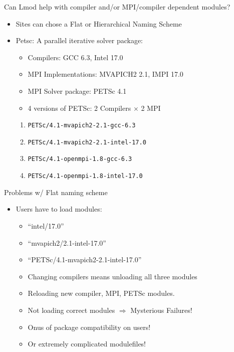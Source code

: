 \documentclass{beamer}
\begin{document}
\begin{frame}{Can Lmod help with compiler and/or MPI/compiler
      dependent modules?}
  \begin{itemize}
    \item Sites can chose a Flat or Hierarchical Naming Scheme
    \item Petsc: A parallel iterative solver package:
      \begin{itemize}
        \item Compilers: GCC 6.3, Intel 17.0
        \item MPI Implementations: MVAPICH2 2.1, IMPI 17.0
        \item MPI Solver package: PETSc 4.1
        \item 4 versions of PETSc: 2 Compilers $\times$ 2 MPI
      \end{itemize}
      \begin{enumerate}
        \item \texttt{PETSc/4.1-mvapich2-2.1-gcc-6.3}
        \item \texttt{PETSc/4.1-mvapich2-2.1-intel-17.0}
        \item \texttt{PETSc/4.1-openmpi-1.8-gcc-6.3}
        \item \texttt{PETSc/4.1-openmpi-1.8-intel-17.0}
      \end{enumerate}
  \end{itemize}
\end{frame}

\begin{frame}{Problems w/ Flat naming scheme}
  \begin{itemize}
    \item Users have to load modules:
      \begin{itemize}
        \item ``intel/17.0''
        \item ``mvapich2/2.1-intel-17.0''
        \item ``PETSc/4.1-mvapich2-2.1-intel-17.0''
        \item Changing compilers means unloading all three modules
        \item Reloading new compiler, MPI, PETSc modules.
        \item Not loading correct modules $\Rightarrow$ Mysterious Failures!
        \item Onus of package compatibility on users!
        \item Or extremely complicated modulefiles!
      \end{itemize}
  \end{itemize}
\end{frame}
\end{document}
